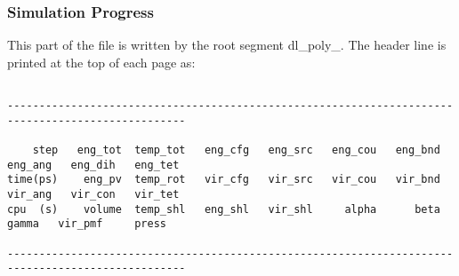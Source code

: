 \subsubsection{Simulation Progress}

This part of the file is written by the \D root segment {\sc
dl\_poly\_}.  The header line is printed at the top of each page
as:

{\scriptsize\begin{verbatim}

--------------------------------------------------------------------------------------------------

    step   eng_tot  temp_tot   eng_cfg   eng_src   eng_cou   eng_bnd   eng_ang   eng_dih   eng_tet
time(ps)    eng_pv  temp_rot   vir_cfg   vir_src   vir_cou   vir_bnd   vir_ang   vir_con   vir_tet
cpu  (s)    volume  temp_shl   eng_shl   vir_shl     alpha      beta     gamma   vir_pmf     press

--------------------------------------------------------------------------------------------------
\end{verbatim}}


